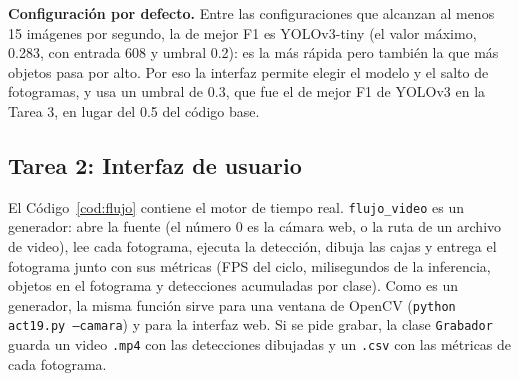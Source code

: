 \documentclass[11pt,letterpaper]{article}
\begin{document}
\textbf{Configuración por defecto.} Entre las configuraciones que alcanzan al menos 15 imágenes por segundo, la de mejor F1 es YOLOv3-tiny (el valor máximo, 0.283, con entrada 608 y umbral 0.2): es la más rápida pero también la que más objetos pasa por alto. Por eso la interfaz permite elegir el modelo y el salto de fotogramas, y usa un umbral de 0.3, que fue el de mejor F1 de YOLOv3 en la Tarea 3, en lugar del 0.5 del código base.

\subsection{Tarea 2: Interfaz de usuario}

El Código~\ref{cod:flujo} contiene el motor de tiempo real. \texttt{flujo\_video} es un generador: abre la fuente (el número 0 es la cámara web, o la ruta de un archivo de video), lee cada fotograma, ejecuta la detección, dibuja las cajas y entrega el fotograma junto con sus métricas (FPS del ciclo, milisegundos de la inferencia, objetos en el fotograma y detecciones acumuladas por clase). Como es un generador, la misma función sirve para una ventana de OpenCV (\texttt{python act19.py --camara}) y para la interfaz web. Si se pide grabar, la clase \texttt{Grabador} guarda un video \texttt{.mp4} con las detecciones dibujadas y un \texttt{.csv} con las métricas de cada fotograma.
\end{document}
